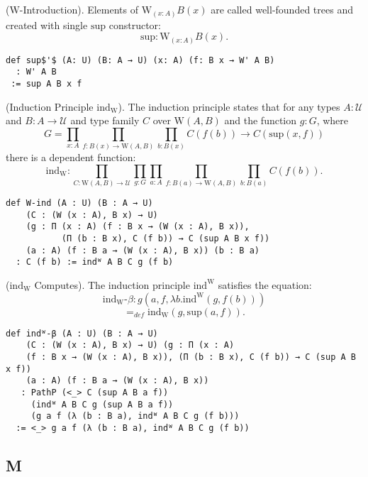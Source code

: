 \documentclass{article}
\begin{document}
\begin{definition} ($\mathrm{W}$-Introduction).
Elements of $\mathrm{W}_{(x : A)} B(x)$ are called
well-founded trees and created with single $\mathrm{sup}$ constructor:
$$
  \mathrm{sup} : \mathrm{W}_{(x: A)} B(x).
$$
\begin{lstlisting}
def sup$'$ (A: U) (B: A → U) (x: A) (f: B x → W' A B)
  : W' A B
 := sup A B x f
\end{lstlisting}
\end{definition}

\begin{theorem} (Induction Principle $\mathrm{ind_W}$).
The induction principle states that for any types $A: \mathcal{U}$
and $B: A \rightarrow \mathcal{U}$ and type family $C$ over $\mathrm{W}(A,B)$
and the function $g : G$, where
$$
  G = \prod_{x: A}\prod_{f: B(x) → \mathrm{W}(A,B)}\prod_{b: B(x)} C(f(b)) → C(\mathrm{sup}(x,f))
$$
there is a dependent function:
$$
   \mathrm{ind_W} : \prod_{C: \mathrm{W}(A,B) → \mathcal{U}}\prod_{g:G}\prod_{a: A}\prod_{f: B(a) → \mathrm{W}(A,B)}\prod_{b: B(a)}C(f(b)).
$$
\begin{lstlisting}
def W-ind (A : U) (B : A → U)
    (C : (W (x : A), B x) → U)
    (g : Π (x : A) (f : B x → (W (x : A), B x)),
           (Π (b : B x), C (f b)) → C (sup A B x f))
    (a : A) (f : B a → (W (x : A), B x)) (b : B a)
  : C (f b) := indᵂ A B C g (f b)
\end{lstlisting}
\end{theorem}

\begin{theorem}($\mathrm{ind_W}$ Computes).
The induction principle $\mathrm{ind^W}$ satisfies the equation:
$$
\mathrm{ind_W}\mbox{-}\beta : g(a,f,\lambda b.\mathrm{ind^W}(g,f(b))) 
$$
$$
  =_{def} \mathrm{ind_W}(g,\mathrm{sup}(a,f)).
$$
\begin{lstlisting}
def indᵂ-β (A : U) (B : A → U)
    (C : (W (x : A), B x) → U) (g : Π (x : A)
    (f : B x → (W (x : A), B x)), (Π (b : B x), C (f b)) → C (sup A B x f))
    (a : A) (f : B a → (W (x : A), B x))
   : PathP (<_> C (sup A B a f))
     (indᵂ A B C g (sup A B a f))
     (g a f (λ (b : B a), indᵂ A B C g (f b)))
  := <_> g a f (λ (b : B a), indᵂ A B C g (f b))
\end{lstlisting}
\end{theorem}

\subsection{M}
\end{document}
